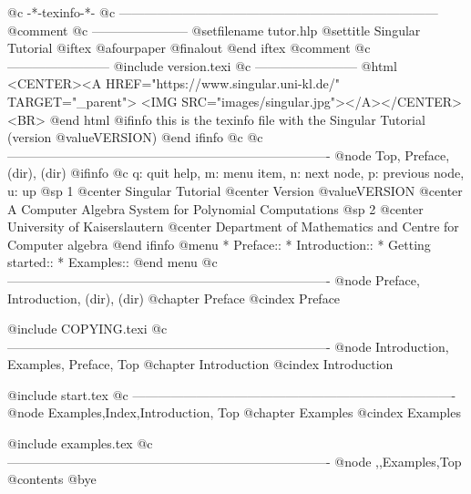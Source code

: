     @c -*-texinfo-*-
@c ---------------------------------------------------------------------------
@comment %
@c -----------------------
@setfilename tutor.hlp
@settitle Singular Tutorial
@iftex
@afourpaper
@finalout
@end iftex
@comment %
@c ------------------------
@include version.texi
@c ------------------------
@html
<CENTER><A HREF="https://www.singular.uni-kl.de/" TARGET="_parent">
<IMG SRC="images/singular.jpg"></A></CENTER><BR>
@end html
@ifinfo
this is the texinfo file with the Singular Tutorial (version @value{VERSION})
@end ifinfo
@c
@c ----------------------------------------------------------------------------
@node    Top, Preface,    (dir),    (dir)
@ifinfo
@c q: quit help, m: menu item, n: next node, p: previous node, u: up
@sp 1
@center Singular Tutorial
@center Version @value{VERSION}
@center A Computer Algebra System for Polynomial Computations
@sp 2
@center University of Kaiserslautern
@center Department of Mathematics and Centre for Computer algebra
@end ifinfo
@menu
* Preface::
* Introduction::
* Getting started::
* Examples::
@end menu
@c ----------------------------------------------------------------------------
@node Preface, Introduction, (dir),  (dir)
@chapter Preface
@cindex Preface

@include COPYING.texi
@c ----------------------------------------------------------------------------
@node Introduction, Examples, Preface, Top
@chapter Introduction
@cindex Introduction

@include start.tex
@c ----------------------------------------------------------------------------
@node Examples,Index,Introduction, Top
@chapter Examples
@cindex Examples

@include examples.tex
@c ----------------------------------------------------------------------------
@node ,,Examples,Top
@contents
@bye
